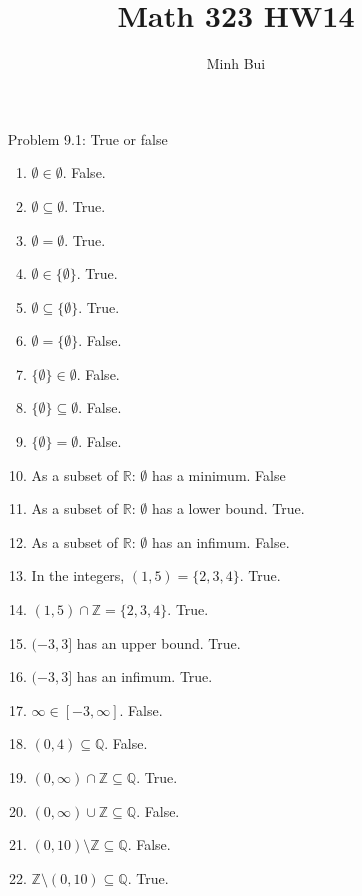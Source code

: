 \documentclass{article}
\author{Minh Bui}
\title{Math 323 HW14}
\theoremstyle{claim}
\theoremstyle{definition}
\begin{document}
\maketitle
\begin{enumerate}
    \item[Problem 9.1:] True or false
        \begin{enumerate}
            \item $\emptyset \in \emptyset$. False.
            \item $\emptyset \subseteq \emptyset$. True.
            \item $\emptyset = \emptyset$. True.
            \item $\emptyset \in \{ \emptyset\}$. True.
            \item $\emptyset \subseteq \{ \emptyset\}$. True.
            \item $\emptyset = \{ \emptyset\}$. False.
            \item $\{ \emptyset \} \in \emptyset$. False. 
            \item $\{ \emptyset\} \subseteq \emptyset$. False.
            \item $\{ \emptyset\} = \emptyset$. False.
            \item As a subset of $\mathbb{R}$: $\emptyset$ has a minimum. False
            \item As a subset of $\mathbb{R}$: $\emptyset$ has a lower bound. True.
            \item As a subset of $\mathbb{R}$: $\emptyset$ has an infimum. False.
            \item In the integers, $(1, 5) = \{2, 3, 4\}$. True.
            \item $(1, 5) \cap \mathbb{Z} = \{2, 3, 4\}$. True.
            \item $(-3, 3]$ has an upper bound. True.
            \item $(-3, 3]$ has an infimum. True.
            \item $\infty \in [-3, \infty]$. False.
            \item $(0, 4) \subseteq \mathbb{Q}$. False.
            \item $(0, \infty) \cap \mathbb{Z} \subseteq \mathbb{Q}$. True.
            \item $(0, \infty) \cup \mathbb{Z} \subseteq \mathbb{Q}$. False.
            \item $(0, 10) \setminus \mathbb{Z} \subseteq \mathbb{Q}$. False.
            \item $\mathbb{Z} \setminus (0, 10) \subseteq \mathbb{Q}$. True.

\end{enumerate}
\end{enumerate}
\end{document}
